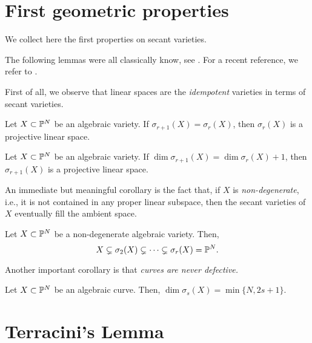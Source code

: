 \section{First geometric properties}
\label{geometrySecants-section-first_properties}

We collect here the first properties on secant varieties. 

The following lemmas were all classically know, see \cite{Pal09}. For a recent reference, we refer to \cite{Rus16}.

First of all, we observe that linear spaces are the \emph{idempotent} varieties in terms of secant varieties. 

\begin{lemma}
    \label{geometrySecants-lemma-palatini_1}
    Let $X\subset \mathbb{P}^N$ be an algebraic variety. If $\sigma_{r+1}(X) = \sigma_r(X)$, then $\sigma_r(X)$ is a projective linear space. 
\end{lemma}

\begin{lemma}
    \label{geometrySecants-lemma-palatini_2}
    Let $X\subset \mathbb{P}^N$ be an algebraic variety. If $\dim\sigma_{r+1}(X) = \dim\sigma_r(X)+1$, then $\sigma_{r+1}(X)$ is a projective linear space. 
\end{lemma}

An immediate but meaningful corollary is the fact that, if $X$ is \emph{non-degenerate}, i.e., it is not contained in any proper linear subspace, then the secant varieties of $X$ eventually fill the ambient space. 

\begin{lemma}
    \label{geometrySecants-lemma-secants_of_non_degenerate}
    Let $X\subset \mathbb{P}^N$ be a non-degenerate algebraic variety. Then, 
    \[
        X \subsetneq \sigma_2(X) \subsetneq \cdots \subsetneq \sigma_r(X) = \mathbb{P}^N.
    \]
\end{lemma}

Another important corollary is that \emph{curves are never defective.}
\begin{lemma}
    \label{geometrySecants-lemma-palatini_curves}
    Let $X\subset \mathbb{P}^N$ be an algebraic curve. Then, $\dim \sigma_s(X) = \min\{N, 2s+1\}$.
\end{lemma}



\section{Terracini's Lemma}
\label{geometrySecants-section-Terracini}

